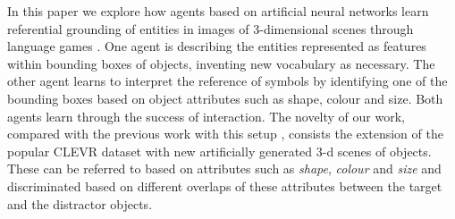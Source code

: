 \documentclass[11pt]{article}
\begin{document}

In this paper we explore how agents based on artificial neural networks learn referential grounding of entities in images of 3-dimensional scenes through language games \citep{Clark:1996aa,Bartlett:2005aa,Kirby:2008ab,SteelsLoetzsch:2009,Zaslavsky:2018aa}. %
One agent is describing the entities represented as features within bounding boxes of objects, inventing new vocabulary as necessary. The other agent learns to interpret the reference of symbols by identifying %
one of the bounding boxes based on object attributes such as shape, colour and size.
Both agents learn through the success of interaction.
The novelty of our work, compared with the previous work with this setup \citep{Kharitonov2019,Lazaridou2016}, consists the extension of the popular CLEVR dataset \citep{Johnson2016} with new artificially generated 3-d scenes of objects. These can be referred to based on attributes such as \emph{shape}, \emph{colour} and \emph{size} and discriminated based on different overlaps of these attributes between the target and the distractor objects. %
\end{document}
